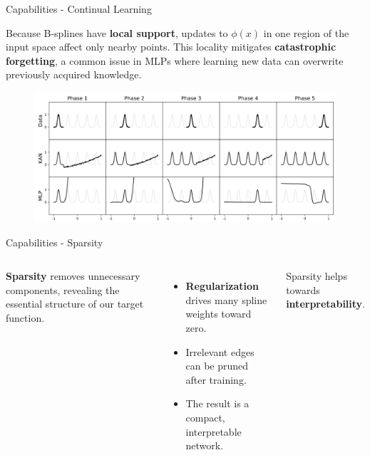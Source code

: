\documentclass[aspectratio=169]{beamer}
\begin{document}

\begin{frame}{Capabilities - Continual Learning}
	
	Because B-splines have \textbf{local support}, updates to $\phi(x)$ in one region of the input space affect only nearby points.  
	This locality mitigates \textbf{catastrophic forgetting}, a common issue in MLPs where learning new data can overwrite previously acquired knowledge.
	
	\begin{figure}
		\centering
		\includegraphics[height=0.6\textheight]{../images/continual_learning.png}
	\end{figure}
	
\end{frame}



\begin{frame}{Capabilities - Sparsity}
	\begin{columns}[T,onlytextwidth]
		
		
		\textbf{Sparsity} removes unnecessary components, revealing the essential structure of our target function.
		
		\vspace{0.6em}
		\begin{itemize}
			\item \textbf{Regularization} drives many spline weights toward zero.
			\item Irrelevant edges can be pruned after training.
			\item The result is a compact, interpretable network.
		\end{itemize}
		
		Sparsity helps towards \textbf{interpretability}.
		
		\centering
		\resizebox{!}{0.65\textheight}{}
		
	\end{columns}
\end{frame}
\end{document}
